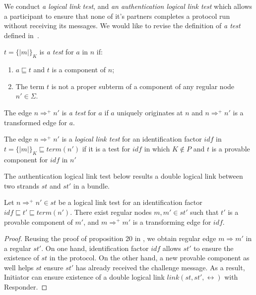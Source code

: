 We conduct \emph{a logical link test}, and \emph{an authentication logical link test} which allows a participant to ensure that none of it's partners completes a protocol run without receiving its messages. We would like to revise the definition of \emph{a test} defined in~\cite{authenticationtests}. 

\begin{Definition}[A Test] 
$t = \{|m|\}_K$ is \emph{a test} for $a$ in $n$ if:
\begin{enumerate}
\item $a\sqsubseteq t$ and $t$ is a component of $n$;
\item The term $t$ is not a proper subterm of a component of any regular node $n' \in \Sigma$. 
\end{enumerate}
The edge $n \Rightarrow^+ n'$ is \emph{a test} for $a$ if $a$ uniquely originates at $n$ and $n \Rightarrow^+ n'$ is a transformed edge for $a$. 
\end{Definition}

\begin{Definition} The edge $n \Rightarrow^+ n'$ is a \emph{logical link test} for an identification factor $idf$ in $t = \{|m|\}_K \sqsubseteq term(n')$ if it is a test for $idf$ in which $K \not\in P$ and $t$ is a provable component for $idf$ in $n'$
\end{Definition}

The authentication logical link test below results a double logical link between two strands $st$ and $st'$ in a bundle. 
\begin{Proposition}\label{logicaltest}Let $n \Rightarrow^+ n' \in st$ be a logical link test for an identification factor $idf \sqsubseteq t' \sqsubseteq term(n')$. There exist regular nodes $m, m' \in st'$ such that $t'$ is a provable component of $m'$, and $m \Rightarrow^+ m'$ is a transforming edge for $idf$. 
\end{Proposition}

\begin{proof}
Reusing the proof of proposition 20 in \cite{Guttman:2002:ATS:568264.568267}, we obtain regular edge $m \Rightarrow m'$ in a regular $st'$. On one hand, identification factor $idf$ allows $st'$ to ensure the existence of $st$ in the protocol. On the other hand, a new provable component as well helps $st$ ensure $st'$ has already received the challenge message. As a result, Initiator can ensure existence of a double logical link $link(st,st',\leftrightarrow)$ with Responder. 
\end{proof}

